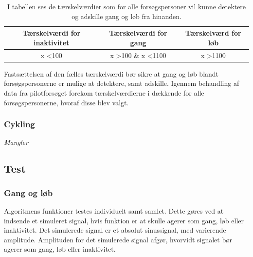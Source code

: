 \begin{table}[H]
	\centering
	\begin{tabular}{ccc}
		\hline
		\rowcolor[HTML]{C0C0C0} 
		Tærskelværdi for inaktivitet & Tærskelværdi for gang & Tærskelværd for løb \\ \hline
		x \textless 100 & x \textgreater 100 \& x \textless 1100 & x \textgreater 1100 \\ \hline
	\end{tabular}
	\caption{I tabellen ses de tærskelværdier som for alle forsøgspersoner vil kunne detektere og adskille gang og løb fra hinanden.}
	\label{tab:faelles_taerskel}
\end{table}\vspace{-0.5cm}
Fastsættelsen af den fælles tærskelværdi bør sikre at gang og løb blandt forsøgspersonerne er mulige at detektere, samt adskille. Igennem behandling af data fra pilotforsøget forekom tærskelværdierne i  dækkende for alle forsøgspersonerne, hvoraf disse blev valgt.

\subsubsection{Cykling}
\textit{Mangler}

\subsection{Test}
\subsubsection{Gang og løb}
Algoritmens funktioner testes individuelt samt samlet. Dette gøres ved at indsende et simuleret signal, hvis funktion er at skulle agerer som gang, løb eller inaktivitet. Det simulerede signal er et absolut sinussignal, med varierende amplitude. Amplituden for det simulerede signal afgør, hvorvidt signalet bør agerer som gang, løb eller inaktivitet.  

